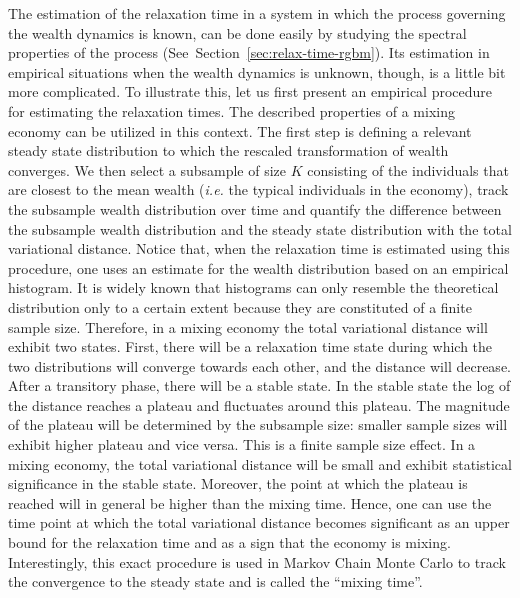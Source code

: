 \documentclass[11pt]{article}
\newcommand{\blue}[1]{{\color{blue} #1}}
\newcommand{\Sref}[1]{Section~\ref{sec:#1}}
\newcommand{\ie}{{\it i.e.}\xspace}
\newcommand{\YB}[1]{\blue{{\it YB: #1 YB}}}
\numberwithin{equation}{section}
\begin{document}
The estimation of the relaxation time in a system in which the process governing the wealth dynamics is known, can be done easily by studying the spectral properties of the process (See~\Sref{relax-time-rgbm}). Its estimation in empirical situations when the wealth dynamics is unknown, though, is a little bit more complicated. To illustrate this, let us first present an empirical procedure for estimating the relaxation times. The described properties of a mixing economy can be utilized in this context. The first step is defining a relevant steady state distribution to which the rescaled transformation of wealth converges. We then select a subsample of size $K$ consisting of the individuals that are closest to the mean wealth (\ie the typical individuals in the economy), track the subsample wealth distribution over time and quantify the difference between the subsample wealth distribution and the steady state distribution with the total variational distance. Notice that, when the relaxation time is estimated using this procedure, one uses an estimate for the wealth distribution based on an empirical histogram. It is widely known that histograms can only resemble the theoretical distribution only to a certain extent because they are constituted of a finite sample size. Therefore, in a mixing economy the total variational distance will exhibit two states. First, there will be a relaxation time state during which the two distributions will converge towards each other, and the distance will decrease. After a transitory phase, there will be a stable state. In the stable state the log of the distance reaches a plateau and fluctuates around this plateau. The magnitude of the plateau will be determined by the subsample size: smaller sample sizes will exhibit higher plateau and vice versa. This is a finite sample size effect. In a mixing economy, the total variational distance will be small and exhibit statistical significance in the stable state. Moreover, the point at which the plateau is reached will in general be higher than the mixing time. Hence, one can use the time point at which the total variational distance becomes significant as an upper bound for the relaxation time and as a sign that the economy is mixing. Interestingly, this exact procedure is used in Markov Chain Monte Carlo to track the convergence to the steady state and is called the ``mixing time''.
\end{document}
